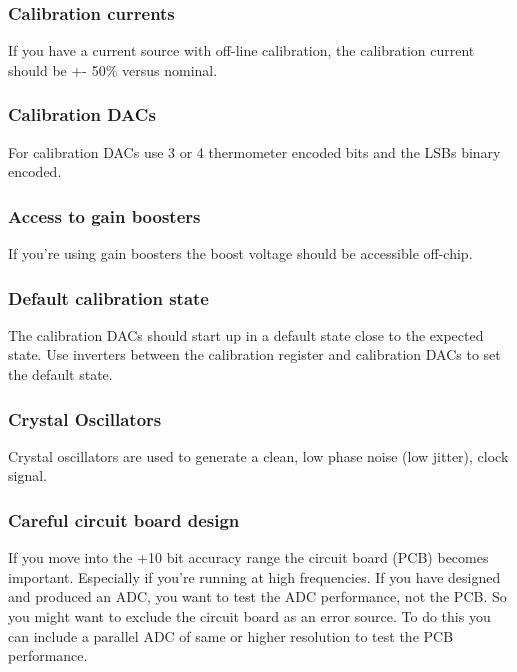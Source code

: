 \subsubsection{Calibration currents}\label{calibration-currents}

If you have a current source with off-line calibration, the calibration
current should be +- 50\% versus nominal.

\subsubsection{Calibration DACs}\label{calibration-dacs}

For calibration DACs use 3 or 4 thermometer encoded bits and the LSBs
binary encoded.

\subsubsection{Access to gain boosters}\label{access-to-gain-boosters}

If you're using gain boosters the boost voltage should be accessible
off-chip.

\subsubsection{Default calibration
state}\label{default-calibration-state}

The calibration DACs should start up in a default state close to the
expected state. Use inverters between the calibration register and
calibration DACs to set the default state.

\subsubsection{Crystal Oscillators}\label{crystal-oscillators}

Crystal oscillators are used to generate a clean, low phase noise (low
jitter), clock signal.

\subsubsection{Careful circuit board
design}\label{careful-circuit-board-design}

If you move into the +10 bit accuracy range the circuit board (PCB)
becomes important. Especially if you're running at high frequencies. If
you have designed and produced an ADC, you want to test the ADC
performance, not the PCB. So you might want to exclude the circuit board
as an error source. To do this you can include a parallel ADC of same or
higher resolution to test the PCB performance.

